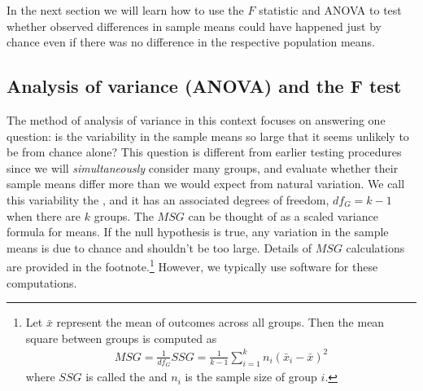 In the next section we will learn how to use the $F$ statistic and ANOVA to test whether observed differences in sample means could have happened just by chance even if there was no difference in the respective population means.


\subsection{Analysis of variance (ANOVA) and the F test}

The method of analysis of variance in this context focuses on answering one question: is the variability in the sample means so large that it seems unlikely to be from chance alone? This question is different from earlier testing procedures since we will \emph{simultaneously} consider many groups, and evaluate whether their sample means differ more than we would expect from natural variation. We call this variability the , and it has an associated degrees of freedom, $df_{G}=k-1$ when there are $k$ groups. The $MSG$ can be thought of as a scaled variance formula for means. If the null hypothesis is true, any variation in the sample means is due to chance and shouldn't be too large. Details of $MSG$ calculations are provided in the footnote.\footnote{Let $\bar{x}$ represent the mean of outcomes across all groups. Then the mean square between groups is computed as
\begin{align*}
MSG = \frac{1}{df_{G}}SSG = \frac{1}{k-1}\sum_{i=1}^{k} n_{i}\left(\bar{x}_{i} - \bar{x}\right)^2
\end{align*}
where $SSG$ is called the  and $n_{i}$ is the sample size of group $i$.}
However, we typically use software for these computations.

